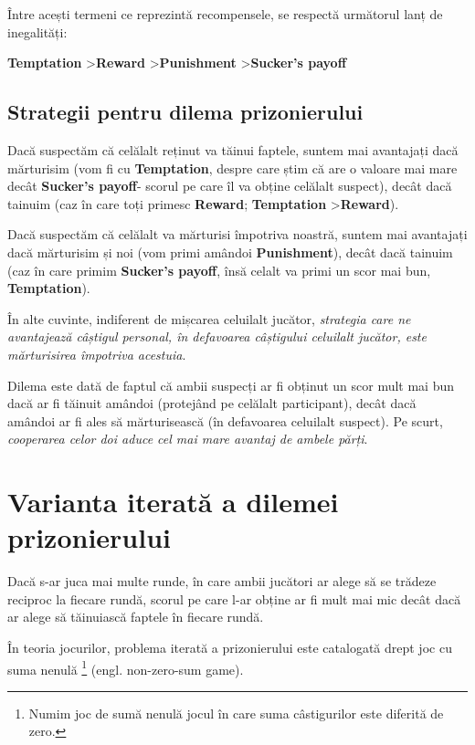 Între acești termeni ce reprezintă recompensele, se respectă următorul lanț de inegalități: 

\begin{center} 
	\textbf{Temptation} \textgreater \textbf{Reward} \textgreater \textbf{Punishment} \textgreater \textbf{Sucker's payoff} 
\end{center} 

\subsection{Strategii pentru dilema prizonierului}

Dacă suspectăm că celălalt reținut va tăinui faptele, suntem mai avantajați dacă mărturisim (vom fi  cu \textbf{Temptation}, despre care știm că are o valoare mai mare decât \textbf{Sucker's payoff}- scorul pe care îl va obține celălalt suspect), decât dacă tainuim (caz în care toți primesc \textbf{Reward}; \textbf{Temptation} \textgreater \textbf{Reward}).

Dacă suspectăm că celălalt va mărturisi împotriva noastră, suntem mai avantajați dacă mărturisim și noi (vom primi amândoi \textbf{Punishment}), decât dacă tainuim (caz în care primim \textbf{Sucker's payoff}, însă celalt va primi un scor mai bun, \textbf{Temptation}).

În alte cuvinte, indiferent de mișcarea celuilalt jucător, \textit{strategia care ne avantajează câștigul personal, în defavoarea câștigului celuilalt jucător, este mărturisirea împotriva acestuia}.

Dilema este dată de faptul că ambii suspecți ar fi obținut un scor mult mai bun dacă ar fi tăinuit amândoi (protejând pe celălalt participant), decât dacă amândoi ar fi ales să mărturisească (în defavoarea celuilalt suspect). Pe scurt, \textit{cooperarea celor doi aduce cel mai mare avantaj de ambele părți}.

\section {Varianta iterată a dilemei prizonierului} 

Dacă s-ar juca mai multe runde, în care ambii jucători ar alege să se trădeze reciproc la fiecare rundă, scorul pe care l-ar obține ar fi mult mai mic decât dacă ar alege să tăinuiască faptele în fiecare rundă. 

În teoria jocurilor, problema iterată a prizonierului este catalogată drept joc cu suma nenulă \footnote{Numim joc de sumă nenulă jocul în care suma câstigurilor este diferită de zero.} (engl. non-zero-sum game).

